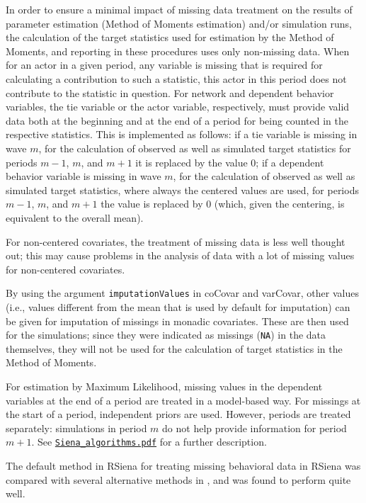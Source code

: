 \documentclass[a4paper,fleqn,11pt]{article}
\newcommand{\+}{\, + \,}
\newcommand{\sfn}[1]{\textsf{#1}}
\newcommand{\RS}{{\sf \textsf{RSiena} }}
\begin{document}
In order to ensure a minimal impact of missing data treatment on
the results of parameter estimation (Method of Moments estimation)
and/or simulation runs, the calculation of the target statistics
used for estimation by the Method of Moments, and reporting in these
procedures uses only non-missing data.
When for an actor in a given period, any variable is missing that is
required for calculating a contribution to such a statistic, this
actor in this period does not contribute to the statistic in
question. For network and dependent behavior variables, the tie variable
or the actor variable, respectively,
must provide valid data both at the beginning and at the end of a
period for being counted in the respective statistics.
This is implemented as follows: if a tie variable is missing in wave $m$,
for the calculation of observed as well as simulated target statistics
for periods $m-1$, $m$, and $m+1$ it is replaced by the value 0;
if a dependent behavior variable is missing in wave $m$,
for the calculation of observed as well as simulated target statistics,
where always the centered values are used, for periods $m-1$, $m$, and $m+1$
the value is replaced by 0 (which, given the centering,
is equivalent to the overall mean).

For non-centered covariates, the treatment of missing data is less
well thought out; this may cause problems in the analysis
of data with a lot of missing values for non-centered covariates.
\medskip

By using the argument \texttt{imputationValues} in \sfn{coCovar}
and \sfn{varCovar}, other values
(i.e., values different from the mean that is used by default
for imputation) can be given for imputation of missings
in monadic covariates.
These are then used for the simulations; since they were indicated as missings
(\texttt{NA}) in the data themselves, they will not be used for the calculation
of target statistics in the Method of Moments.
\medskip

For estimation by Maximum Likelihood, missing values in the dependent variables
at the end of a period are treated in a model-based way.
For missings at the start of a period, independent priors are used.
However, periods are treated separately: simulations in period $m$ do not help
provide information for period $m+1$.
See
\href{http://www.stats.ox.ac.uk/~snijders/siena/Siena_algorithms.pdf}{\texttt{Siena\_algorithms.pdf}}
for a further description.
\medskip

The default method in \RS for treating missing behavioral data in \RS was compared
with several alternative methods in \citet{ZandbergHuisman2019}, and was found to
perform quite well.
\end{document}
